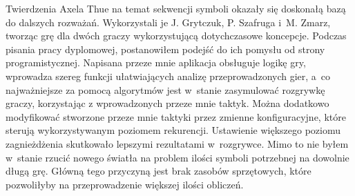 \documentclass[document]{xmgr}
\begin{document}
\summary
Twierdzenia Axela Thue na temat sekwencji symboli okazały się doskonałą bazą do dalszych rozważań. Wykorzystali je J. Grytczuk, P. Szafruga i~M. Zmarz, tworząc grę dla dwóch graczy wykorzystującą dotychczasowe koncepcje. Podczas pisania pracy dyplomowej, postanowiłem podejść do ich pomysłu od strony programistycznej. Napisana przeze mnie aplikacja obsługuje logikę gry, wprowadza szereg funkcji ułatwiających analizę przeprowadzonych gier, a~co najważniejsze za pomocą algorytmów jest w~stanie zasymulować rozgrywkę graczy, korzystając z wprowadzonych przeze mnie taktyk. Można dodatkowo modyfikować stworzone przeze mnie taktyki przez zmienne konfiguracyjne, które sterują wykorzystywanym poziomem rekurencji. Ustawienie większego poziomu zagnieżdżenia skutkowało lepszymi rezultatami w~rozgrywce. Mimo to nie byłem w~stanie rzucić nowego światła na problem ilości symboli potrzebnej na dowolnie długą grę. Główną tego przyczyną jest brak zasobów sprzętowych, które pozwoliłyby na przeprowadzenie większej ilości obliczeń.

\appendix






\listoftables

\listoffigures

\lstlistoflistings

\oswiadczenie
\end{document}
